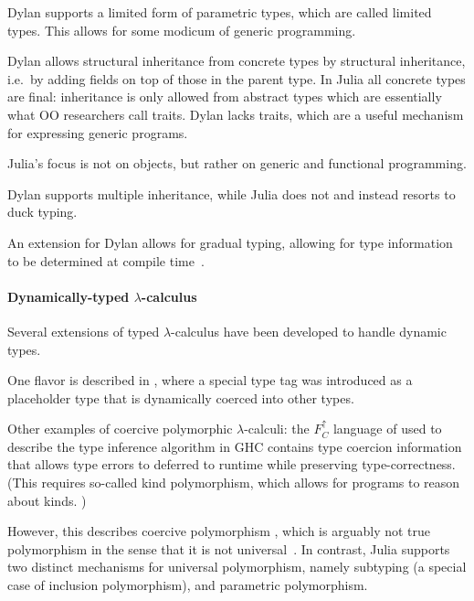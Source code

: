 Dylan supports a limited form of parametric types, which are called limited types.\cite{dylanman} This allows for some modicum of generic programming.

Dylan allows structural inheritance from concrete types by structural inheritance, i.e.\ by adding fields on top of those in the parent type. In Julia all concrete types are final: inheritance is only allowed from abstract types which are essentially what OO researchers call traits. Dylan lacks traits, which are a useful mechanism for expressing generic programs.

Julia's focus is not on objects, but rather on generic and functional programming.

Dylan supports multiple inheritance, while Julia does not and instead resorts to duck typing.

An extension for Dylan allows for gradual typing, allowing for type information to be determined at compile time~\cite{Mehnert2010}.

\paragraph{Dynamically-typed $\lambda$-calculus}

Several extensions of typed $\lambda$-calculus have been developed to handle dynamic types.

One flavor is described in \cite{Henglein, 1994}, where a special type tag 
was introduced as a placeholder type that is dynamically coerced into other
types. %

Other examples of coercive polymorphic $\lambda$-calculi: the $F^\uparrow_C$ language of \cite{Vytiniotis2012,Yorgey2012} used to describe the type inference algorithm in GHC \cite{Weirich2011} contains type coercion information that allows type errors to deferred to runtime \cite{Vytiniotis2012} while preserving type-correctness. (This requires so-called kind polymorphism, which allows for programs to reason about kinds. \cite{Yorgey2012})


However, this describes coercive polymorphism \cite{Cardelli1985}, which
is arguably not true polymorphism in the sense that it is not
universal~\cite{Strachey1967,Strachey2000}. In contrast, Julia supports two distinct
mechanisms for universal polymorphism, namely subtyping (a special case of
inclusion polymorphism), and parametric polymorphism.

